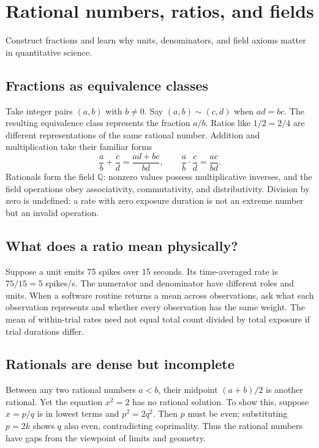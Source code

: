 \chapter{Rational numbers, ratios, and fields}\label{ch:rationals}
\begin{readergoal}Construct fractions and learn why units, denominators, and field axioms matter in quantitative science.\end{readergoal}
\section{Fractions as equivalence classes}
Take integer pairs $(a,b)$ with $b\ne0$. Say $(a,b)\sim(c,d)$ when $ad=bc$. The resulting equivalence class represents the fraction $a/b$. Ratios like $1/2=2/4$ are different representations of the same rational number. Addition and multiplication take their familiar forms
\[\frac ab+\frac cd=\frac{ad+bc}{bd},\qquad \frac ab\cdot\frac cd=\frac{ac}{bd}.\]
Rationals form the field $\mathbb Q$: nonzero values possess multiplicative inverses, and the field operations obey associativity, commutativity, and distributivity. Division by zero is undefined: a rate with zero exposure duration is not an extreme number but an invalid operation.

\section{What does a ratio mean physically?}
Suppose a unit emits 75 spikes over 15 seconds. Its time-averaged rate is $75/15=5$ spikes/s. The numerator and denominator have different roles and units. When a software routine returns a mean across observations, ask what each observation represents and whether every observation has the same weight. The mean of within-trial rates need not equal total count divided by total exposure if trial durations differ.

\section{Rationals are dense but incomplete}
Between any two rational numbers $a<b$, their midpoint $(a+b)/2$ is another rational. Yet the equation $x^2=2$ has no rational solution. To show this, suppose $x=p/q$ is in lowest terms and $p^2=2q^2$. Then $p$ must be even; substituting $p=2k$ shows $q$ also even, contradicting coprimality. Thus the rational numbers have gaps from the viewpoint of limits and geometry.

